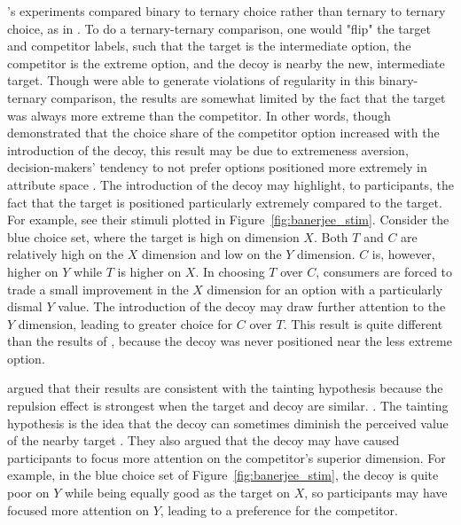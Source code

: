 \textcite{banerjeeFactorsThatPromote2024}'s experiments compared binary to ternary choice rather than ternary to ternary choice, as in \textcite{spektorWhenGoodLooks2018b}. To do a ternary-ternary comparison, one would "flip" the target and competitor labels, such that the target is the intermediate option, the competitor is the extreme option, and the decoy is nearby the new, intermediate target. Though \textcite{banerjeeFactorsThatPromote2024} were able to generate violations of regularity in this binary-ternary comparison, the results are somewhat limited by the fact that the target was always more extreme than the competitor. In other words, though \textcite{banerjeeFactorsThatPromote2024} demonstrated that the choice share of the competitor option increased with the introduction of the decoy, this result may be due to extremeness aversion, decision-makers' tendency to not prefer options positioned more extremely in attribute space \parencite{simonson1992choice}. The introduction of the decoy may highlight, to participants, the fact that the target is positioned particularly extremely compared to the target. For example, see their stimuli plotted in Figure~\ref{fig:banerjee_stim}. Consider the blue choice set, where the target is high on dimension $X$. Both $T$ and $C$ are relatively high on the $X$ dimension and low on the $Y$ dimension. $C$ is, however, higher on $Y$ while $T$ is higher on $X$. In choosing $T$ over $C$, consumers are forced to trade a small improvement in the $X$ dimension for an option with a particularly dismal $Y$ value. The introduction of the decoy may draw further attention to the $Y$ dimension, leading to greater choice for $C$ over $T$. This result is quite different than the results of \textcite{spektorWhenGoodLooks2018b}, because the decoy was never positioned near the less extreme option. 

\textcite{banerjeeFactorsThatPromote2024} argued that their results are consistent with the tainting hypothesis because the repulsion effect is strongest when the target and decoy are similar. . The tainting hypothesis is the idea that the decoy can sometimes diminish the perceived value of the nearby target \parencite{simonson2014vices}. They also argued that the decoy may have caused participants to focus more attention on the competitor's superior dimension. For example, in the blue choice set of Figure~\ref{fig:banerjee_stim}, the decoy is quite poor on $Y$ while being equally good as the target on $X$, so participants may have focused more attention on $Y$, leading to a preference for the competitor. 

